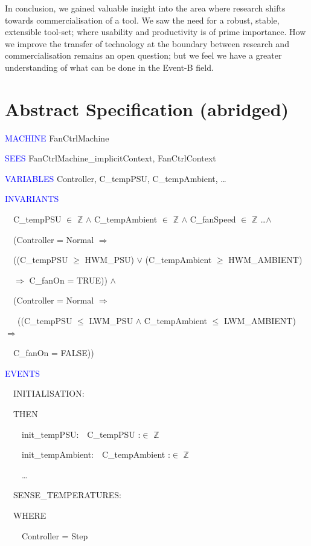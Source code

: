 \documentclass{llncs}%
\begin{document}
In conclusion, we gained valuable insight into the area where research shifts towards commercialisation of a tool. We saw the need for a robust, stable, extensible tool-set; where usability and productivity is of prime importance. How we improve the transfer of technology at the boundary between research and commercialisation remains an open question; but we feel we have a greater understanding of what can be done in the Event-B field.
%


%
%
%
\appendix
%
%
%
\section{Abstract Specification (abridged)}\label{abst}
\scriptsize
\textcolor{blue}{MACHINE} FanCtrlMachine 

\textcolor{blue}{SEES} FanCtrlMachine\_implicitContext, FanCtrlContext 

\textcolor{blue}{VARIABLES} Controller, C\_tempPSU, C\_tempAmbient, \ldots \ \  \ 

\textcolor{blue}{INVARIANTS}

\ \ C\_tempPSU ${\in}$ $\mathbb{Z}$  ${\wedge}$ C\_tempAmbient ${\in}$ $\mathbb{Z}$  ${\wedge}$ C\_fanSpeed ${\in}$ $\mathbb{Z}$ \ldots ${\wedge}$ \ 

\ \ (Controller = Normal $\Rightarrow $ \

 \ \ ((C\_tempPSU ${\geq}$ HWM\_PSU) ${\vee}$ (C\_tempAmbient ${\geq}$
HWM\_AMBIENT)\

\ \ \quad $\Rightarrow $ C\_fanOn = TRUE)) ${\wedge}$\ \  \ 

\ \ (Controller = Normal $\Rightarrow $

\ \   \ ((C\_tempPSU ${\leq}$ LWM\_PSU ${\wedge}$ C\_tempAmbient ${\leq}$
LWM\_AMBIENT) $\Rightarrow $ \

\ \ \quad C\_fanOn = FALSE))\ \ 

\bigskip
\textcolor{blue}{EVENTS}

\ \ INITIALISATION:\ \ 

\ \ THEN

\ \ \ \ init\_tempPSU:\ \ C\_tempPSU :${\in}$ $\mathbb{Z}$ 

\ \ \ \ init\_tempAmbient:\ \ C\_tempAmbient :${\in}$ $\mathbb{Z}$ 

\ \ \ \ {\dots}

\bigskip

\ \ SENSE\_TEMPERATURES:\ \  \ 

\ \ WHERE

\ \ \ \ Controller = Step \ \ 
\end{document}

